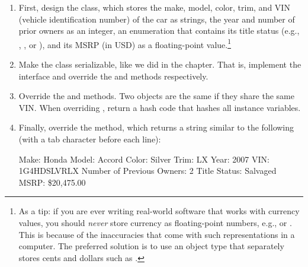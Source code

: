\begin{enumerate}[label=(\alph*)]
    \item First, design the  class, which stores the make, model, color, trim, and VIN (vehicle identification number) of the car as strings, the year and number of prior owners as an integer, an enumeration that contains its title status (e.g., , , or ), and its MSRP (in USD) as a floating-point value.\footnote{As a tip: if you are ever writing real-world software that works with currency values, you should \emph{never} store currency as floating-point numbers, e.g.,  or . This is because of the inaccuracies that come with such representations in a computer. The preferred solution is to use an object type that separately stores cents and dollars such as .}

    \item Make the  class serializable, like we did in the chapter. That is, implement the  interface and override the  and  methods respectively. 

    \item Override the  and  methods. Two  objects are the same if they share the same VIN. When overriding , return a hash code that hashes all instance variables.
    
    \item Finally, override the  method, which returns a string similar to the following (with a tab character before each line):
\begin{verbnobox}[\small]
    Make: Honda
    Model: Accord
    Color: Silver
    Trim: LX
    Year: 2007
    VIN: 1G4HDSLVRLX
    Number of Previous Owners: 2
    Title Status: Salvaged
    MSRP: \$20,475.00
\end{verbnobox}


\end{enumerate}
